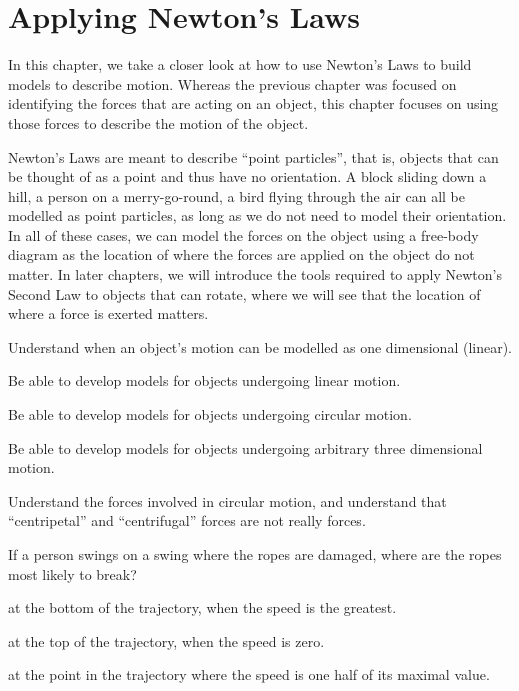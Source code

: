 
\chapter{Applying Newton's Laws}
\label{chap:ApplyingNewtonsLaws}
In this chapter, we take a closer look at how to use Newton's Laws to build models to describe motion. Whereas the previous chapter was focused on identifying the forces that are acting on an object, this chapter focuses on using those forces to describe the motion of the object.

Newton's Laws are meant to describe ``point particles'', that is, objects that can be thought of as a point and thus have no orientation. A block sliding down a hill, a person on a merry-go-round, a bird flying through the air can all be modelled as point particles, as long as we do not need to model their orientation. In all of these cases, we can model the forces on the object using a free-body diagram as the location of where the forces are applied on the object do not matter. In later chapters, we will introduce the tools required to apply Newton's Second Law to objects that can rotate, where we will see that the location of where a force is exerted matters.

\begin{learningObjectives}
{
\item Understand when an object's motion can be modelled as one dimensional (linear).
\item Be able to develop models for objects undergoing linear motion.
\item Be able to develop models for objects undergoing circular motion.
\item Be able to develop models for objects undergoing arbitrary three dimensional motion.
\item Understand the forces involved in circular motion, and understand that ``centripetal'' and ``centrifugal'' forces are not really forces.
}
\end{learningObjectives}

\begin{opening}
\begin{MCquestion}{If a person swings on a swing where the ropes are damaged, where are the ropes most likely to break? }
\item at the bottom of the trajectory, when the speed is the greatest. \correct
\item at the top of the trajectory, when the speed is zero.
\item at the point in the trajectory where the speed is one half of its maximal value.
\end{MCquestion}
\end{opening}



